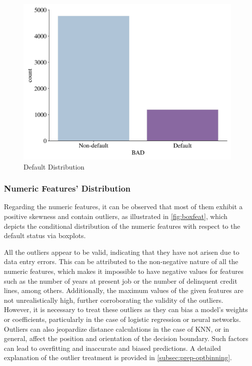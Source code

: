 \begin{figure}[H]
\centering
\caption{Default Distribution}
\label{fig:defaultdist}
\includegraphics[width=130mm]{Figures/Default_Distribution.jpg}\vspace{-1em}
\vspace{-1em}
\end{figure}

\subsubsection{Numeric Features' Distribution}
\label{subsubsec:numdist}

Regarding the numeric features, it can be observed that most of them exhibit a positive skewness and contain outliers, as illustrated in \autoref{fig:boxfeat}, which depicts the conditional distribution of the numeric features with respect to the default status via boxplots.

All the outliers appear to be valid, indicating that they have not arisen due to data entry errors.
This can be attributed to the non-negative nature of all the numeric features, which makes it impossible to have negative values for features such as the number of years at present job or the number of delinquent credit lines, among others.
Additionally, the maximum values of the given features are not unrealistically high, further corroborating the validity of the outliers.
However, it is necessary to treat these outliers as they can bias a model's weights or coefficients, particularly in the case of logistic regression or neural networks.
Outliers can also jeopardize distance calculations in the case of KNN, or in general, affect the position and orientation of the decision boundary.
Such factors can lead to overfitting and inaccurate and biased predictions.
A detailed explanation of the outlier treatment is provided in \autoref{subsec:prep-optbinning}.

